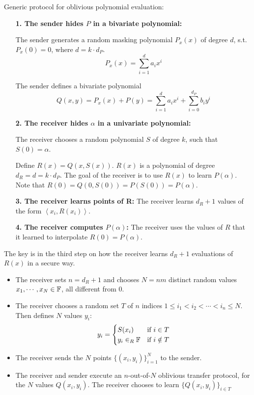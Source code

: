Generic protocol for oblivious polynomial evaluation:

\begin{itemize}[align = left, leftmargin=*]

\item[\textbf{1. The sender hides $P$ in a bivariate polynomial:}]

The sender generates a random masking polynomial $P_x (x)$ of degree $d$, s.t. $P_x (0) = 0$, where $d = k \cdot d_P$.
$$P_x (x) = \sum_{i=1}^{d} a_i x^i$$

The sender defines a bivariate polynomial
$$ Q(x,y) = P_x(x) + P(y) = \sum_{i=1}^{d} a_i x^i + \sum_{i=0}^{d_P} b_i y^i $$

\item[\textbf{2. The receiver hides $\alpha$ in a univariate polynomial:}]

The receiver chooses a random polynomial $S$ of degree $k$, such that $S(0) = \alpha$.

Define $R(x) = Q( x, S(x))$. $R(x)$ is a polynomial of degree $d_R = d = k \cdot d_P$. The goal of the receiver is to use $R(x)$ to learn $P(\alpha)$. Note that $R(0) = Q(0,S(0)) = P(S(0)) = P(\alpha)$.

\item[\textbf{3. The receiver learns points of R:}] The receiver learns $d_R + 1$ values of the form $\left\langle x_i , R(x_i) \right\rangle$.

\item[\textbf{4. The receiver computes $P(\alpha)$:}] The receiver uses the values of $R$ that it learned to interpolate $R(0)=P(\alpha)$.

\end{itemize}

The key is in the third step on how the receiver learns $d_R + 1$ evaluations of $R(x)$ in a secure way.

\begin{itemize}[align = left, leftmargin=*]
\item The receiver sets $n = d_R + 1$ and chooses $N = nm$ distinct random values $x_1, \cdots, x_N \in {\mathbb F}$, all different from $0$.

\item The receiver chooses a random set $T$ of $n$ indices $1 \leq i_1 < i_2 < \cdots < i_n \leq N$. Then defines $N$ values $y_i$:
    $$y_i = 
        \begin{cases}
            S(x_i)        & \mbox{if } i \in T \\
            y_i \in_R {\mathbb F} & \mbox{if } i \notin T
        \end{cases} $$
        
\item The receiver sends the $N$ points $\{(x_i, y_i)\}^N_{i=1}$ to the sender.

\item The receiver and sender execute an $n$-out-of-$N$ oblivious transfer protocol, for the $N$ values $Q(x_i,y_i)$. The receiver chooses to learn $\{Q(x_i,y_i)\}_{i\in T}$
\end{itemize}


